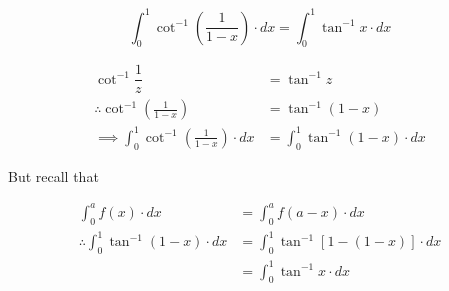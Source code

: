 \documentclass[14pt,fleqn]{extarticle}
\begin{document}
\begin{snippet}
    \correct

\[\int_0^1\cot^{-1}\left(\dfrac{1}{1-x} \right)\cdot dx = \int_0^1\tan^{-1} x\cdot dx \]
    
    
    \reason

\begin{align}
	\cot^{-1} \dfrac{1}{z} &= \tan^{-1} z \\
	\therefore \cot^{-1} \left(\frac{1}{1-x} \right) &= \tan^{-1} \left(1-x \right) \\
	\implies \int_0^1 \cot^{-1} \left(\frac{1}{1-x} \right)\cdot dx &= \int_0^1 \tan^{-1} \left(1-x \right)\cdot dx 
\end{align}
	
But recall that
 
\begin{align} 
	\int_0^a f(x)\cdot dx &= \int_0^a f(a-x)\cdot dx  \\
	\therefore\int_0^1 \tan^{-1} \left(1-x \right)\cdot dx &= \int_0^1\tan^{-1} \left[1-\left(1-x \right) \right]\cdot dx \\
	&=\int_0^1\tan^{-1} x\cdot dx  
\end{align}
    
\end{snippet} 
\end{document}
